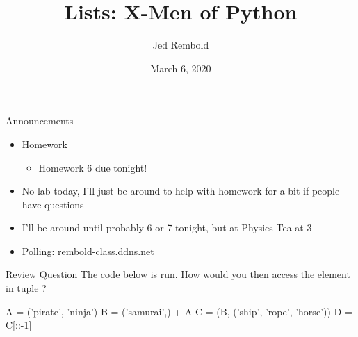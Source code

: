 \documentclass[pdf, aspectratio=169, 12pt]{beamer}
\title{Lists: X-Men of Python}
\author{Jed Rembold}
\date{March 6, 2020}
\begin{document}
\begin{frame}{Announcements}
	\begin{itemize}
		\item Homework
			\begin{itemize}
				\item Homework 6 due tonight!
			\end{itemize}
		\item No lab today, I'll just be around to help with homework for a bit if people have questions
		\item I'll be around until probably 6 or 7 tonight, but at Physics Tea at 3
		\item Polling: \url{rembold-class.ddns.net}
	\end{itemize}
\end{frame}

\begin{frame}[fragile]{Review Question}
		The code below is run. How would you then access the  element in tuple ?
		\begin{poll}
		\item {}
		\item {}
		\item {}
		\item {}
		\end{poll}
		
		\begin{pythoncode}
			A = ('pirate', 'ninja')
			B = ('samurai',) + A
			C = (B, ('ship', 'rope', 'horse'))
			D = C[::-1]
		\end{pythoncode}
\end{frame}

\end{document}
